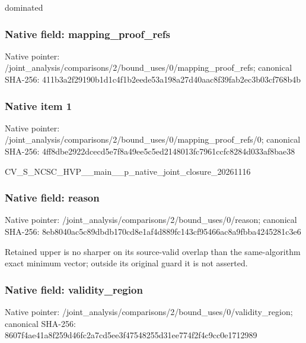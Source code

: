 \documentclass[10pt,a4paper]{article}
\begin{document}
\begingroup\raggedright\sloppy dominated\par\endgroup

\subsubsection{Native field: mapping\_\allowbreak{}proof\_\allowbreak{}refs}
Native pointer: /joint\_\allowbreak{}analysis/comparisons/2/bound\_\allowbreak{}uses/0/mapping\_\allowbreak{}proof\_\allowbreak{}refs; canonical SHA-256: 411b3a2f29190b1d1c4f1b2eede53a198a27d40aac8f39fab2ec3b03cf768b4b

\subsubsection{Native item 1}
Native pointer: /joint\_\allowbreak{}analysis/comparisons/2/bound\_\allowbreak{}uses/0/mapping\_\allowbreak{}proof\_\allowbreak{}refs/0; canonical SHA-256: 4ff8dbe2922dcecd5e7f8a49ee5c5ed2148013fc7961ccfc8284d033af8bae38

\begingroup\raggedright\sloppy CV\_\allowbreak{}S\_\allowbreak{}NCSC\_\allowbreak{}HVP\_\allowbreak{}\_\allowbreak{}main\_\allowbreak{}\_\allowbreak{}p\_\allowbreak{}native\_\allowbreak{}joint\_\allowbreak{}closure\_\allowbreak{}20261116\par\endgroup

\subsubsection{Native field: reason}
Native pointer: /joint\_\allowbreak{}analysis/comparisons/2/bound\_\allowbreak{}uses/0/reason; canonical SHA-256: 8eb8040ac5c89dbdb170cd8e1af4d889fc143cf95466ac8a9fbba4245281c3e6

\begingroup\raggedright\sloppy Retained upper is no sharper on its source-valid overlap than the same-algorithm exact minimum vector;\allowbreak{} outside its original guard it is not asserted.\par\endgroup

\subsubsection{Native field: validity\_\allowbreak{}region}
Native pointer: /joint\_\allowbreak{}analysis/comparisons/2/bound\_\allowbreak{}uses/0/validity\_\allowbreak{}region; canonical SHA-256: 8607f4ae41a8f259d46fc2a7cd5ee3f47548255d31ee774f2f4c9cc0e1712989
\end{document}
